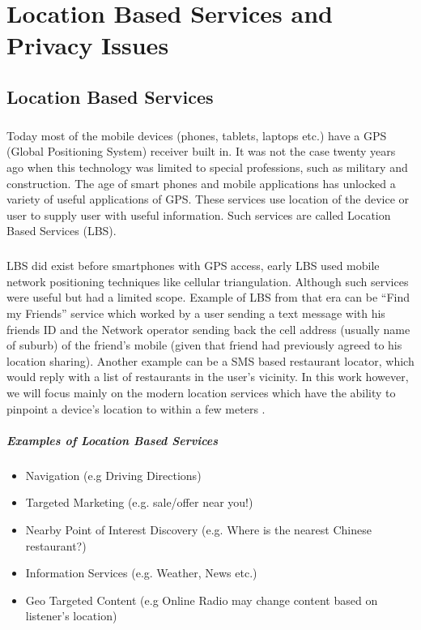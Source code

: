 \documentclass[12pt]{report}
\theoremstyle{named}
\begin{document}
\chapter{Location Based Services and Privacy Issues}
\label{chap:LocationBasedServices}
\section{Location Based Services}
\paragraph{}
Today most of the mobile devices (phones, tablets, laptops etc.) have a GPS (Global Positioning System) receiver built in. It was not the case twenty years ago when this technology was limited to special professions, such as military and construction. The age of smart phones and mobile applications has unlocked a variety of useful applications of GPS. These services use location of the device or user to supply user with useful information. Such services are called Location Based Services (LBS).
\paragraph{}
LBS did exist before smartphones with GPS access, early LBS \cite{lbsShu} used mobile network positioning techniques like cellular triangulation. Although such services were useful but had a limited scope. Example of LBS from that era can be “Find my Friends” service which worked by a user sending a text message with his friends ID and the Network operator sending back the cell address (usually name of suburb) of the friend’s mobile (given that friend had previously agreed to his location sharing). Another example can be a SMS based restaurant locator, which would reply with a list of restaurants in the user’s vicinity. In this work however, we will focus mainly on the modern location services which have the ability to pinpoint a device's location to within a few meters \cite{ TGIS:TGIS1152}.
\paragraph{Examples of Location Based Services}
\begin{itemize}
\item Navigation (e.g Driving Directions)
\item Targeted Marketing (e.g. sale/offer near you!)
\item Nearby Point of Interest Discovery (e.g. Where is the nearest Chinese restaurant?)
\item Information Services (e.g. Weather, News etc.)
\item Geo Targeted Content (e.g Online Radio may change content based on listener's location)
\end{itemize}
\end{document}
